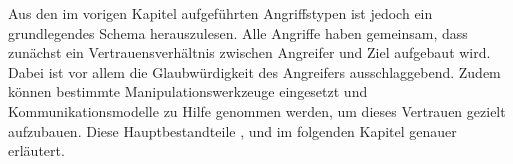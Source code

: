 Aus den im vorigen Kapitel aufgeführten Angriffstypen ist jedoch ein grundlegendes Schema herauszulesen.
Alle Angriffe haben gemeinsam, dass zunächst ein Vertrauensverhältnis zwischen Angreifer und Ziel aufgebaut wird.
Dabei ist vor allem die Glaubwürdigkeit des Angreifers ausschlaggebend.
Zudem können bestimmte Manipulationswerkzeuge eingesetzt und Kommunikationsmodelle zu Hilfe genommen werden, um dieses Vertrauen gezielt aufzubauen.
Diese Hauptbestandteile ,  und  im folgenden Kapitel genauer erläutert.


